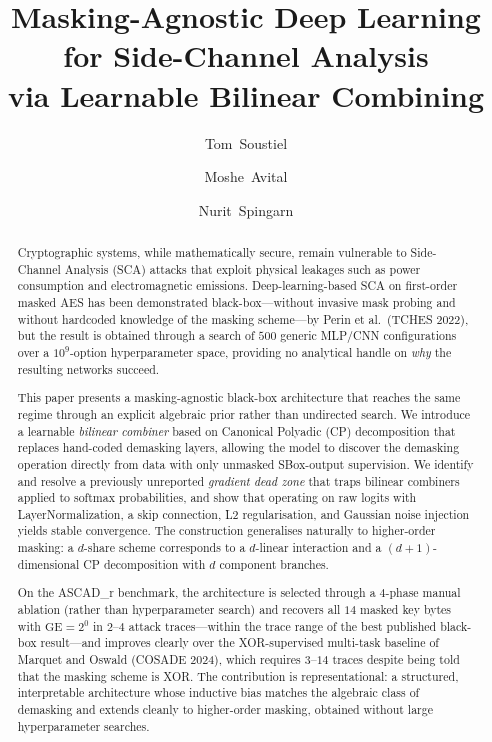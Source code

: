 \documentclass[runningheads]{llncs}
\title{Masking-Agnostic Deep Learning\\ for Side-Channel Analysis\\ via Learnable Bilinear Combining}
\author{Tom~Soustiel \and
         Moshe~Avital \and
         Nurit~Spingarn}
\institute{Technion -- Israel Institute of Technology, Haifa, Israel\\
 \email{tom.soustiel@campus.technion.ac.il}}
\newcommand{\GE}{\mathrm{GE}}
\begin{document}
\maketitle

\begin{abstract}
Cryptographic systems, while mathematically secure, remain vulnerable to Side-Channel Analysis (SCA) attacks that exploit physical leakages such as power consumption and electromagnetic emissions.
Deep-learning-based SCA on first-order masked AES has been demonstrated black-box---without invasive mask probing and without hardcoded knowledge of the masking scheme---by Perin et al.\ (TCHES 2022), but the result is obtained through a search of $500$ generic MLP/CNN configurations over a $10^{9}$-option hyperparameter space, providing no analytical handle on \emph{why} the resulting networks succeed.

This paper presents a masking-agnostic black-box architecture that reaches the same regime through an explicit algebraic prior rather than undirected search.
We introduce a learnable \emph{bilinear combiner} based on Canonical Polyadic (CP) decomposition that replaces hand-coded demasking layers, allowing the model to discover the demasking operation directly from data with only unmasked SBox-output supervision.
We identify and resolve a previously unreported \emph{gradient dead zone} that traps bilinear combiners applied to softmax probabilities, and show that operating on raw logits with LayerNormalization, a skip connection, L2 regularisation, and Gaussian noise injection yields stable convergence.
The construction generalises naturally to higher-order masking: a $d$-share scheme corresponds to a $d$-linear interaction and a $(d{+}1)$-dimensional CP decomposition with $d$ component branches.

On the ASCAD\_r benchmark, the architecture is selected through a $4$-phase manual ablation (rather than hyperparameter search) and recovers all $14$ masked key bytes with $\GE = 2^{0}$ in $2$--$4$ attack traces---within the trace range of the best published black-box result---and improves clearly over the XOR-supervised multi-task baseline of Marquet and Oswald (COSADE 2024), which requires $3$--$14$ traces despite being told that the masking scheme is XOR.
The contribution is representational: a structured, interpretable architecture whose inductive bias matches the algebraic class of demasking and extends cleanly to higher-order masking, obtained without large hyperparameter searches.

\end{abstract}
\end{document}
